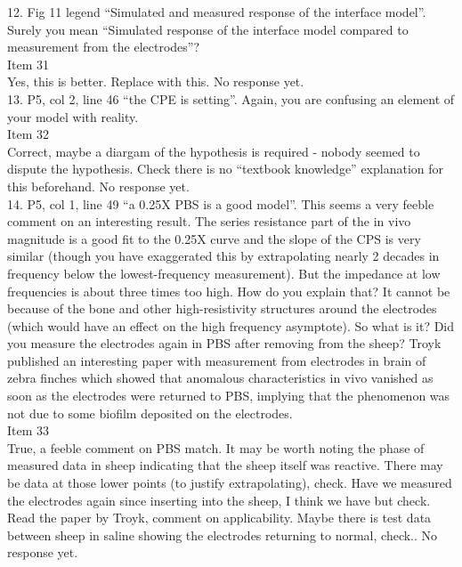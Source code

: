 \documentclass[journal, a4paper]{IEEEtran}
\begin{document}
{12. Fig 11 legend ``Simulated and measured response of the interface model''. Surely you mean ``Simulated response of the interface model compared to measurement from the electrodes''?\\
{\color{OliveGreen}
    Item 31\\
    {\color{Red} Yes, this is better. Replace with this.}
    No response yet.
}\\

13. P5, col 2, line 46 ``the CPE is setting''. Again, you are confusing an element of your model with reality.\\
{\color{OliveGreen}
    Item 32\\
    {\color{Red} Correct, maybe a diargam of the hypothesis is required - nobody seemed to dispute the hypothesis. Check there is no ``textbook knowledge'' explanation for this beforehand.}
    No response yet.
}\\

14. P5, col 1, line 49 ``a 0.25X PBS is a good model''.  This seems a very feeble comment on an interesting result. The series resistance part of the in vivo magnitude is a good fit to the 0.25X curve and the slope of the CPS is very similar (though you have exaggerated this by extrapolating nearly 2 decades in frequency below the lowest-frequency measurement). But the impedance at low frequencies is about three times too high. How do you explain that? It cannot be because of the bone and other high-resistivity structures around the electrodes (which would have an effect on the high frequency asymptote). So what is it? Did you measure the electrodes again in PBS after removing from the sheep? Troyk published an interesting paper with measurement from electrodes in brain of zebra finches which showed that anomalous characteristics in vivo vanished as soon as the electrodes were returned to PBS, implying that the phenomenon was not due to some biofilm deposited on the electrodes.\\
{\color{OliveGreen}
    Item 33\\
    {\color{Red} True, a feeble comment on PBS match. It may be worth noting the phase of measured data in sheep indicating that the sheep itself was reactive. There may be data at those lower points (to justify extrapolating), check. Have we measured the electrodes again since inserting into the sheep, I think we have but check.  Read the paper by Troyk, comment on applicability. Maybe there is test data between sheep in saline showing the electrodes returning to normal, check.}.
    No response yet.
}\\
}
\end{document}

